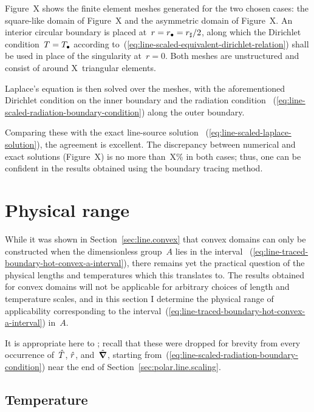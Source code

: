 Figure~X shows the finite element meshes generated %
for the two chosen cases:
the square-like domain of Figure~X %
and the asymmetric domain of Figure~X. %
An interior circular boundary is placed at~$r = r_\bullet = r_\sharp / 2$,
along which the Dirichlet condition~$T = T_\bullet$
according to~(\ref{eq:line-scaled-equivalent-dirichlet-relation})
shall be used
in place of the singularity at~$r = 0$.
Both meshes are unstructured
and consist of around X~triangular elements. %

Laplace's equation is then solved over the meshes,
with the aforementioned Dirichlet condition on the inner boundary
and the radiation condition~%
  (\ref{eq:line-scaled-radiation-boundary-condition})
along the outer boundary.

Comparing these with the exact line-source solution~%
  (\ref{eq:line-scaled-laplace-solution}),
the agreement is excellent.
The discrepancy between numerical and exact solutions
(Figure~X) %
is no more than~X\% in both cases; %
thus, one can be confident in the results obtained
using the boundary tracing method.

\section{Physical range}
\label{sec:line.physical}

While it was shown in Section~\ref{sec:line.convex} that
convex domains can only be constructed
when the dimensionless group~$A$ lies in the interval~%
  (\ref{eq:line-traced-boundary-hot-convex-a-interval}),
there remains yet the practical question of
the physical lengths and temperatures which this translates to.
The results obtained for convex domains
will not be applicable for arbitrary choices
of length and temperature scales,
and in this section I determine the physical range of applicability
corresponding to
the interval~(\ref{eq:line-traced-boundary-hot-convex-a-interval}) in~$A$.

It is appropriate here to ;
recall that these were dropped for brevity
from every occurrence of~$\hat{T}$, $\hat{r}$, and~$\mathop{}\!\hat{\mathop{}\!\boldsymbol{\mathbf{\nabla}}}$,
starting from~(\ref{eq:line-scaled-radiation-boundary-condition})
near the end of Section~\ref{sec:polar.line.scaling}.

\subsection{Temperature}
\label{sec:line.physical.temperature}

